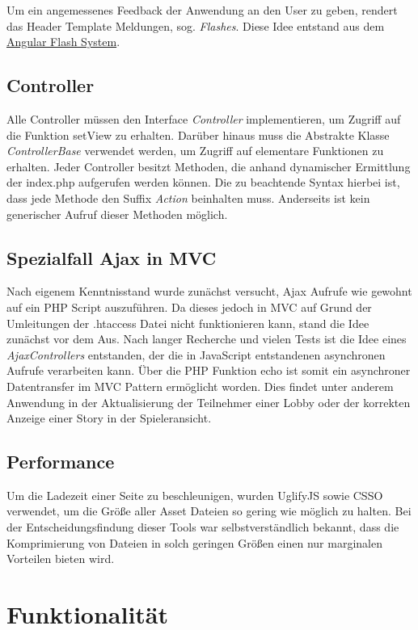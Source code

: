 Um ein angemessenes Feedback der Anwendung an den User zu geben, rendert das Header Template Meldungen, sog. \emph{Flashes}. Diese Idee entstand aus dem \hyperlink{https://sachinchoolur.github.io/angular-flash/}{Angular Flash System}.
\subsection{Controller}\label{subsec:controller}
Alle Controller müssen den Interface \emph{Controller} implementieren, um Zugriff auf die Funktion setView zu erhalten. Darüber hinaus muss die Abstrakte Klasse \emph{ControllerBase} verwendet werden, um Zugriff auf elementare Funktionen zu erhalten. Jeder Controller besitzt Methoden, die anhand dynamischer Ermittlung der index.php aufgerufen werden können. Die zu beachtende Syntax hierbei ist, dass jede Methode den Suffix \emph{Action} beinhalten muss. Anderseits ist kein generischer Aufruf dieser Methoden möglich. 

\subsection{Spezialfall Ajax in MVC}\label{subsec:ajax}
Nach eigenem Kenntnisstand wurde zunächst versucht, Ajax Aufrufe wie gewohnt auf ein PHP Script auszuführen. Da dieses jedoch in MVC auf Grund der Umleitungen der .htaccess Datei nicht funktionieren kann, stand die Idee zunächst vor dem Aus. Nach langer Recherche und vielen Tests ist die Idee eines \emph{AjaxControllers} entstanden, der die in JavaScript entstandenen asynchronen Aufrufe verarbeiten kann. Über die PHP Funktion echo ist somit ein asynchroner Datentransfer im MVC Pattern ermöglicht worden. Dies findet unter anderem Anwendung in der Aktualisierung der Teilnehmer einer Lobby oder der korrekten Anzeige einer Story in der Spieleransicht. 

\subsection{Performance}\label{subsec:performance}
Um die Ladezeit einer Seite zu beschleunigen, wurden UglifyJS sowie CSSO verwendet, um die Größe aller Asset Dateien so gering wie möglich zu halten. Bei der Entscheidungsfindung dieser Tools war selbstverständlich bekannt, dass die Komprimierung von Dateien in solch geringen Größen einen nur marginalen Vorteilen bieten wird.

\section{Funktionalität}\label{sec:funktionalität}

